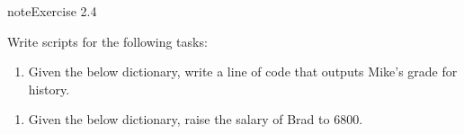 \documentclass[letterpaper,10pt,english]{jupyterBook}
\begin{document}
\begin{sphinxadmonition}{note}{Exercise 2.4}

\sphinxAtStartPar
Write scripts for the following tasks:
\begin{enumerate}
%
\item {} 
\sphinxAtStartPar
Given the below dictionary, write a line of code that outputs Mike’s grade for history.

\end{enumerate}

\begin{sphinxVerbatim}[commandchars=\\\{\}]
  
     
         
             
             
                 
                 
\end{sphinxVerbatim}
\begin{enumerate}
%
\setcounter{enumi}{1}
\item {} 
\sphinxAtStartPar
Given the below dictionary, raise the salary of Brad to 6800.

\end{enumerate}


\end{sphinxadmonition}
\end{document}
